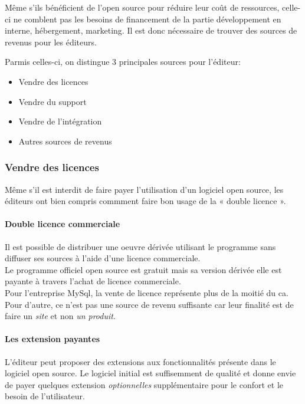 			Même s'ils bénéficient de l'open source pour réduire leur coût de ressources, celle-ci ne comblent pas les besoins de financement de la partie développement en interne, hébergement, marketing. Il est donc nécessaire de trouver des sources de revenus pour les éditeurs.

			Parmis celles-ci, on distingue 3 principales sources pour l'éditeur:

			\begin{itemize}[label=\textbullet, font=\LARGE \color{burntorange}]
				\item Vendre des licences
				\item Vendre du support
				\item Vendre de l'intégration
				\item Autres sources de revenus
			\end{itemize}

			\subsubsection{Vendre des licences}

			Même s'il est interdit de faire payer l'utilisation d'un logiciel open source, les éditeurs ont bien compris commment faire bon usage de la « double licence ».

			\paragraph{Double licence commerciale\\}

			Il est possible de distribuer une oeuvre dérivée utilisant le programme sans diffuser ses sources à l'aide d'une licence commerciale.\\
			Le programme officiel open source est gratuit mais sa version dérivée elle est payante à travers l'achat de licence commerciale.\\

			Pour l'entreprise MySql, la vente de licence représente plus de la moitié du \acrfull{ca}. Pour d'autre, ce n'est pas une source de revenu suffisante car leur finalité est de faire un \textit{site} et non \textit{un produit}.

			\paragraph{Les extension payantes\\}

			L'éditeur peut proposer des extensions aux fonctionnalités présente dans le logiciel open source. Le logiciel initial est suffisemment de qualité et donne envie de payer quelques extension \textit{optionnelles} supplémentaire pour le confort et le besoin de l'utilisateur.

